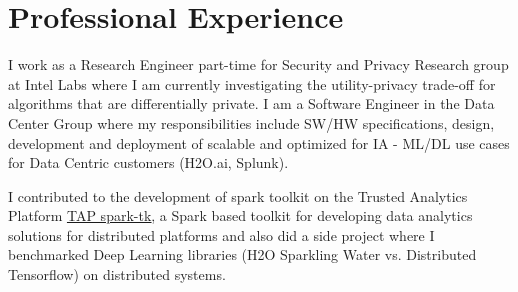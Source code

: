\documentclass[hidelinks,letterpaper]{deedy-resume-openfont} %
\begin{document}
\begin{minipage}[t]{0.66\textwidth} %




\section{Professional Experience}
{}
\small I work as a Research Engineer part-time for Security and Privacy Research group at Intel Labs where I am currently investigating the utility-privacy trade-off for algorithms that are differentially private. I am a Software Engineer in the Data Center Group where my responsibilities include SW/HW specifications, design, development and deployment of scalable and optimized for IA - ML/DL use cases for Data Centric customers (H2O.ai, Splunk). 
\sectionsep

\small I contributed to the development of spark toolkit on the Trusted Analytics Platform \href{https://github.com/trustedanalytics/spark-tk}{\underline{TAP spark-tk}}, a Spark based toolkit for developing data analytics solutions for distributed platforms and also did a side project where I benchmarked Deep Learning libraries (H2O Sparkling Water vs. Distributed Tensorflow) on distributed systems.
\sectionsep


\end{minipage}
\end{document}

